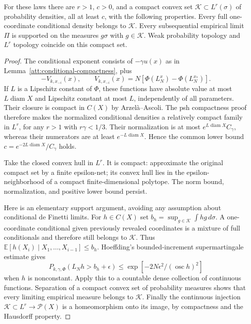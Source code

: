 \begin{lemma}
\label{att:directing-class}
For these laws there are $r>1$, $c>0$, and a compact convex set
$\mathcal K\subset L^r(\sigma)$ of probability densities, all at least
$c$, with the following properties. Every full one-coordinate conditional
density belongs to $\mathcal K$. Every subsequential empirical limit
$\Pi$ is supported on the measures $g\sigma$ with $g\in\mathcal K$.
Weak probability topology and $L^r$ topology coincide on this compact set.
\end{lemma}

\begin{proof}
The conditional exponent consists of $-\gamma u(x)$ as in
Lemma~\ref{att:conditional-compactness}, plus
\[
 -V_{k,x_{-i}}(x),\qquad
 V_{k,x_{-i}}(x)=N[\Phi(L_N^x)-\Phi(L_N^{x_*})].
\]
If $L$ is a Lipschitz constant of $\Phi$, these functions have absolute
value at most $L\operatorname{diam}X$ and Lipschitz constant at most
$L$, independently of all parameters. Their closure is compact in
$C(X)$ by Arzel\`a--Ascoli. The psh compactness proof therefore makes
the normalized conditional densities a relatively compact family in
$L^r$, for any $r>1$ with $r\gamma<1/3$. Their normalization is at
most $e^{L\operatorname{diam}X}C_\gamma$, whereas their numerators are
at least $e^{-L\operatorname{diam}X}$. Hence the common lower bound
$c=e^{-2L\operatorname{diam}X}/C_\gamma$ holds.

Take the closed convex hull in $L^r$. It is compact: approximate the
original compact set by a finite epsilon-net; its convex hull lies in
the epsilon-neighborhood of a compact finite-dimensional polytope.
The norm bound, normalization, and positive lower bound persist.

Here is an elementary support argument, avoiding any assumption about
conditional de Finetti limits. For $h\in C(X)$ set
$b_h=\sup_{g\in\mathcal K}\int hg\,d\sigma$. A one-coordinate
conditional given previously revealed coordinates is a mixture of full
conditionals and therefore still belongs to $\mathcal K$. Thus
$\mathbb E[h(X_i)\mid X_1,\ldots,X_{i-1}]\le b_h$. Hoeffding's
bounded-increment supermartingale estimate gives
\[
 P_{k,\gamma,\Phi}(L_N h>b_h+\epsilon)
 \le \exp[-2N\epsilon^2/(\operatorname{osc}h)^2]
\]
when $h$ is nonconstant. Apply this to a countable dense collection of
continuous functions. Separation of a compact convex set of probability
measures shows that every limiting empirical measure belongs to
$\mathcal K$. Finally the continuous injection
$\mathcal K\subset L^r\to\mathcal P(X)$ is a homeomorphism onto
its image, by compactness and the Hausdorff property.
\end{proof}

